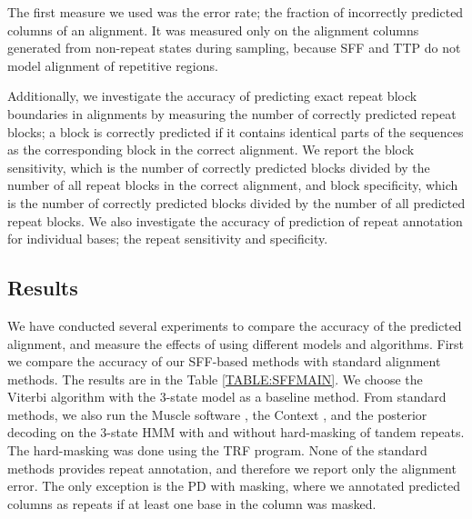 The first measure we used was the error rate; the fraction of incorrectly
predicted columns of an alignment. It was measured only on the alignment
columns generated from non-repeat states during sampling, because SFF and TTP
do not model alignment of repetitive regions.

Additionally, we investigate the accuracy of predicting exact repeat block
boundaries in alignments by measuring the number of correctly predicted repeat
blocks; a block is correctly predicted if it contains identical parts of the
sequences as the corresponding block in the correct alignment. We report the
block sensitivity, which is the number of correctly predicted blocks divided by
the number of all repeat blocks in the correct alignment, and block
specificity, which is the number of correctly predicted blocks divided by
the number of all predicted repeat blocks.  We also investigate the accuracy of
prediction of repeat annotation for individual bases; the repeat sensitivity
and specificity.

\subsection{Results}\label{SECTION:REPSIMRESULTS}
We have conducted several experiments to compare
the accuracy of the predicted alignment, and measure the effects of
using different models and algorithms.
First we compare the
accuracy of our SFF-based methods with standard alignment methods. 
%
The results are in the Table
\ref{TABLE:SFFMAIN}. We choose the Viterbi algorithm with the 3-state model as a
baseline method. From standard methods, we also run the Muscle software
\cite{Edgar2004}, the Context \cite{Hickey2011}, and the posterior decoding on the 3-state HMM
with and without hard-masking of tandem repeats.  The hard-masking was done using the TRF
program. None of the standard methods provides repeat annotation, and
therefore we report only the alignment error. The only exception is the PD with
masking, where we annotated predicted columns as repeats if at least one base
in the column was masked.

